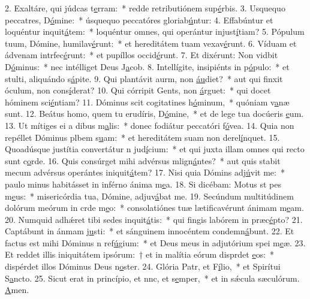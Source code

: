 2. Exaltáre, qui júdcas t\uline{e}rram:~* redde retributiónem sup\uline{é}rbis.
3. Usquequo peccatres, D\uline{ó}mine:~* úsquequo peccatóres gloriab\uline{ú}ntur:
4. Effabúntur et loquéntur inquit\uline{á}tem:~* loquéntur omnes, qui operántur injust\uline{í}tiam?
5. Pópulum tuum, Dómine, humilav\uline{é}runt:~* et hereditátem tuam vexav\uline{é}runt.
6. Víduam et ádvenam intrfec\uline{é}runt:~* et pupíllos occid\uline{é}runt.
7. Et dixérunt: Non vidbit D\uline{ó}minus:~* nec intélliget Deus J\uline{a}cob.
8. Intellígite, insipiénts in p\uline{ó}pulo:~* et stulti, aliquándo s\uline{á}pite.
9. Qui plantávit aurm, non \uline{áu}diet?~* aut qui finxit óculum, non cons\uline{í}derat?
10. Qui córripit Gents, non \uline{á}rguet:~* qui docet hóminem sci\uline{é}ntiam?
11. Dóminus scit cogitatines h\uline{ó}minum,~* quóniam v\uline{a}næ sunt.
12. Beátus homo, quem tu erudíris, D\uline{ó}mine,~* et de lege tua docúeris \uline{e}um.
13. Ut mítiges ei a dibus m\uline{a}lis:~* donec fodiátur peccatóri f\uline{ó}vea.
14. Quia non repéllet Dóminus plbem s\uline{u}am:~* et hereditátem suam non derel\uline{í}nquet.
15. Quoadúsque justítia convertátur n jud\uline{í}cium:~* et qui juxta illam omnes qui recto sunt c\uline{o}rde.
16. Quis consúrget mihi advérsus mlign\uline{á}ntes?~* aut quis stabit mecum advérsus operántes iniquit\uline{á}tem?
17. Nisi quia Dómins adj\uline{ú}vit me:~* paulo minus habitásset in inférno ánima m\uline{e}a.
18. Si dicébam: Motus st pes m\uline{e}us:~* misericórdia tua, Dómine, adjuv\uline{á}bat me.
19. Secúndum multitúdinem dolórum meórum in crde m\uline{e}o:~* consolatiónes tuæ lætificavérunt ánimam m\uline{e}am.
20. Numquid adhǽret tibi sedes inquit\uline{á}tis:~* qui fingis labórem in præc\uline{é}pto?
21. Captábunt in ánmam j\uline{u}sti:~* et sánguinem innocéntem condemn\uline{á}bunt.
22. Et factus est mihi Dóminus n ref\uline{ú}gium:~* et Deus meus in adjutórium spei m\uline{e}æ.
23. Et reddet illis iniquitátem ipsórum:~† et in malítia eórum disprdet \uline{e}os:~* dispérdet illos Dóminus Deus n\uline{o}ster.
24. Glória Patr, et F\uline{í}lio,~* et Spirítui S\uline{a}ncto.
25. Sicut erat in princípio, et nnc, et s\uline{e}mper,~* et in sǽcula sæculórum. \uline{A}men.
